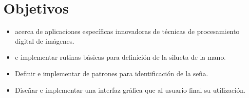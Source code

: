 \section*{Objetivos}

\begin{itemize}
\item {} acerca de aplicaciones específicas innovadoras
de técnicas de procesamiento digital de imágenes.

\bigskip
	\item {} e implementar rutinas básicas para definición de la silueta de la mano.
	\item Definir e implementar  de patrones para identificación de la seña.
	\item Diseñar e implementar una interfaz gráfica que  al usuario final su utilización.
\end{itemize}

